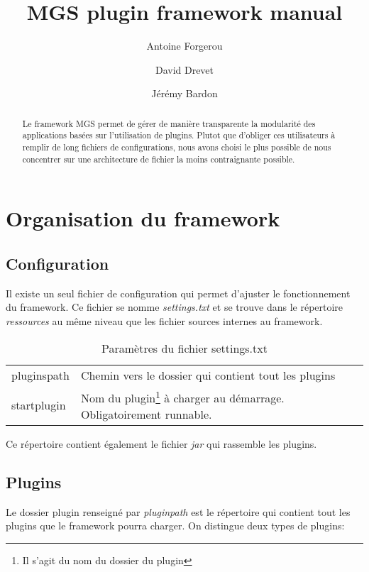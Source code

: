\documentclass[12pt,a4paper]{article}
\title{MGS plugin framework manual}
\author{Antoine Forgerou \and David Drevet \and Jérémy Bardon}
\date{}
\begin{document}
	\renewcommand{\contentsname}{Sommaire}
	\renewcommand{\arraystretch}{1.8}
	\maketitle	
	
	\vspace{0.80cm}
	\tableofcontents	

	\thispagestyle{empty}	
	\setcounter{page}{0}
	\newpage
	
\begin{abstract}
Le framework MGS permet de gérer de manière transparente la modularité des 
applications basées sur l'utilisation de plugins. Plutot que d'obliger ces 
utilisateurs à remplir de long fichiers de configurations, nous avons choisi 
le plus possible de nous concentrer sur une architecture de fichier la moins
contraignante possible.
\end{abstract}

\section{Organisation du framework}
\subsection{Configuration}
Il existe un seul fichier de configuration qui permet d'ajuster le fonctionnement 
du framework. Ce fichier se nomme \emph{settings.txt} et se trouve dans le 
répertoire \emph{ressources} au même niveau que les fichier sources internes au 
framework.

\begin{table}[h]
\centering
	\begin{tabular}{lp{9cm}}
		pluginspath & Chemin vers le dossier qui contient tout les plugins\\
					 
		startplugin & Nom du plugin\footnote{Il s'agit du nom du dossier du 
		plugin} à charger au démarrage. Obligatoirement runnable.\\					 
	\end{tabular}	
\caption{Paramètres du fichier settings.txt}
\end{table}
	
Ce répertoire contient également le fichier \emph{jar} qui rassemble les plugins.
\subsection{Plugins}
Le dossier plugin renseigné par \emph{pluginpath} est le répertoire qui contient 
tout les plugins que le framework pourra charger. On distingue deux types de 
plugins:
\end{document}

